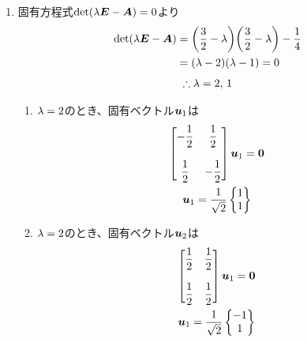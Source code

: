 \begin{ans*}
  ${}$
  \begin{enumerate}[label=(\arabic*)]
    \item 固有方程式$\det({\lambda}\bm{E} - \bm{A})=0$より
    \begin{align}
      \det({\lambda}\bm{E} - \bm{A})
      &= \biggl(\frac{3}{2} - {\lambda}\biggr)\biggl(\frac{3}{2} - {\lambda}\biggr) - \frac{1}{4} \\
      &= ({\lambda} - 2)({\lambda} - 1) = 0
    \end{align}
    \begin{gather}
      \therefore {\lambda} = 2,\,1
    \end{gather}
    \begin{enumerate}[label=(\roman*)]
      \item ${\lambda} = 2$のとき、固有ベクトル${\bm{u}}_1$は
      \begin{gather}
        \begin{bmatrix}
          \displaystyle -\frac{1}{2} & \displaystyle\frac{1}{2} \\
          & \\
          \displaystyle \frac{1}{2} & \displaystyle -\frac{1}{2}
        \end{bmatrix}{\bm{u}}_1 = \bm{0} \\
        {\bm{u}}_1 = \frac{1}{\sqrt{2}}\begin{Bmatrix}
          1 \\ 1
        \end{Bmatrix}
      \end{gather}
      \item ${\lambda} = 2$のとき、固有ベクトル${\bm{u}}_2$は
      \begin{gather}
        \begin{bmatrix}
          \displaystyle \frac{1}{2} & \displaystyle \frac{1}{2} \\
          & \\
          \displaystyle \frac{1}{2} & \displaystyle \frac{1}{2}
        \end{bmatrix}{\bm{u}}_1 = \bm{0} \\
        {\bm{u}}_1 = \frac{1}{\sqrt{2}}\begin{Bmatrix}
          -1 \\ 1
\end{Bmatrix}
\end{gather}
\end{enumerate}
\end{enumerate}
\end{ans*}
